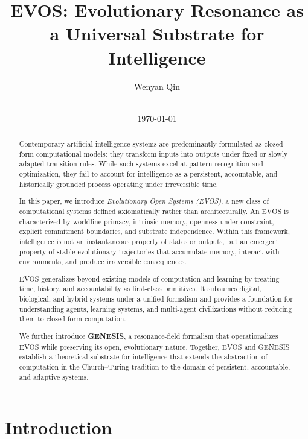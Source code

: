 \documentclass[11pt]{article}
\title{EVOS: Evolutionary Resonance as a Universal Substrate for Intelligence}
\author{Wenyan Qin}
\affil{MapelAI Intelligence Inc.}
\date{\evosversion \\ \today}
\begin{document}
\maketitle

\begin{abstract}
Contemporary artificial intelligence systems are predominantly formulated as
closed-form computational models: they transform inputs into outputs under fixed
or slowly adapted transition rules. While such systems excel at pattern recognition
and optimization, they fail to account for intelligence as a persistent, accountable,
and historically grounded process operating under irreversible time.

In this paper, we introduce \emph{Evolutionary Open Systems (EVOS)}, a new class of
computational systems defined axiomatically rather than architecturally. An EVOS is
characterized by worldline primacy, intrinsic memory, openness under constraint,
explicit commitment boundaries, and substrate independence. Within this framework,
intelligence is not an instantaneous property of states or outputs, but an emergent
property of stable evolutionary trajectories that accumulate memory, interact with
environments, and produce irreversible consequences.

EVOS generalizes beyond existing models of computation and learning by treating
time, history, and accountability as first-class primitives. It subsumes digital,
biological, and hybrid systems under a unified formalism and provides a foundation
for understanding agents, learning systems, and multi-agent civilizations without
reducing them to closed-form computation.

We further introduce \textbf{GENESIS}, a resonance-field formalism that operationalizes
EVOS while preserving its open, evolutionary nature. Together, EVOS and GENESIS
establish a theoretical substrate for intelligence that extends the abstraction of
computation in the Church--Turing tradition to the domain of persistent, accountable,
and adaptive systems.
\end{abstract}

\tableofcontents

\newpage


\section{Introduction}
\end{document}
